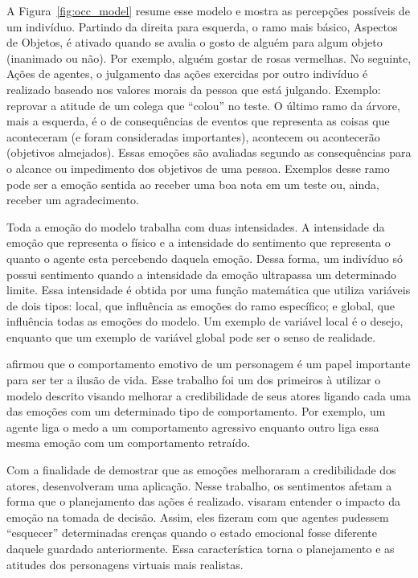 A Figura~\ref{fig:occ_model} resume esse modelo e mostra as
percepções possíveis de um indivíduo.  Partindo da direita para esquerda, o
ramo mais básico, Aspectos de Objetos, é ativado quando se avalia o gosto de
alguém para algum objeto (inanimado ou não). Por exemplo, alguém gostar de
rosas vermelhas.  No seguinte, Ações de agentes, o julgamento das ações
exercidas por outro indivíduo é realizado baseado nos valores morais da pessoa
que está julgando. Exemplo: reprovar a atitude de um colega que ``colou'' no
teste. O último ramo da árvore, mais a esquerda, é o de consequências de
eventos que representa as coisas que aconteceram (e foram consideradas
importantes), acontecem ou acontecerão (objetivos almejados)\dev{}. Essas
emoções são avaliadas segundo as consequências para o alcance ou impedimento
dos objetivos de uma pessoa. Exemplos desse ramo pode ser a emoção sentida
ao receber uma boa nota em um teste ou, ainda, receber um agradecimento.

Toda a emoção do modelo trabalha com duas intensidades. A intensidade da
emoção que representa o físico e a intensidade do sentimento que representa o
quanto o agente esta percebendo daquela emoção. Dessa forma, um indivíduo só
possui sentimento quando a intensidade da emoção ultrapassa um
determinado\dev{}
limite.  Essa intensidade é obtida por uma função matemática que utiliza
variáveis de dois tipos: local, que influência as emoções do ramo específico;
e global, que influência todas as emoções do modelo.  Um exemplo de variável
local é o desejo, enquanto que um exemplo de variável global pode ser o senso
de realidade.

\citet{bates1994role} afirmou que o comportamento emotivo de um personagem é
um papel importante para ser ter a ilusão de vida. Esse trabalho foi um dos
primeiros à utilizar o modelo descrito visando melhorar a credibilidade de
seus atores ligando cada uma das emoções com um determinado tipo de
comportamento. Por exemplo, um agente liga o medo a um comportamento agressivo
enquanto outro liga essa mesma emoção com um comportamento retraído.

Com a finalidade de demostrar que as emoções melhoraram a credibilidade dos
atores, \citet{zhang2009emotional} desenvolveram uma aplicação. Nesse
trabalho, os sentimentos afetam a forma que o planejamento das ações é
realizado. \citet{neto2010construction} visaram entender o impacto da emoção
na tomada de decisão. Assim, eles fizeram com que agentes pudessem
``esquecer'' determinadas crenças quando o estado emocional fosse diferente
daquele guardado anteriormente. Essa característica torna o planejamento e as
atitudes dos personagens virtuais mais realistas.

